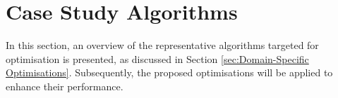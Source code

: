 




\section{Case Study Algorithms}\label{sec:SIFT}
In this section, an overview of the representative algorithms targeted for optimisation is presented, as discussed in Section \ref{sec:Domain-Specific Optimisations}. Subsequently, the proposed optimisations will be applied to enhance their performance.


